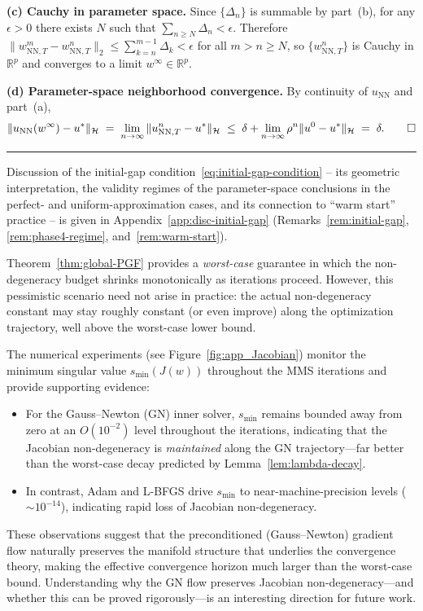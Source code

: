 \documentclass[twoside,11pt]{article}
\newcommand{\BlackBoxProof}{\rule{1.5ex}{1.5ex}}
\renewenvironment{proof}{\par\noindent{\bf Proof\ }}{\hfill\BlackBoxProof\par\medskip}
\newcommand{\R}{\mathbb{R}}
\newcommand{\NN}{\mathrm{NN}}
\newcommand{\calH}{\mathcal{H}}
\begin{document}
\begin{proof}
\smallskip
\noindent\textbf{(c) Cauchy in parameter space.}
Since $\{\Delta_n\}$ is summable by part~(b), for any $\epsilon>0$ there exists $N$ such that $\sum_{n\ge N}\Delta_n<\epsilon$. Therefore $\|w^m_{\NN,T}-w^n_{\NN,T}\|_2\le\sum_{k=n}^{m-1}\Delta_k<\epsilon$ for all $m>n\ge N$, so $\{w^n_{\NN,T}\}$ is Cauchy in $\R^p$ and converges to a limit $w^\infty\in\R^p$.

\smallskip
\noindent\textbf{(d) Parameter-space neighborhood convergence.}
By continuity of $u_\NN$ and part~(a),
\[
\|u_\NN(w^\infty)-u^*\|_\calH \;=\; \lim_{n\to\infty}\|u^n_{\NN,T}-u^*\|_\calH \;\le\;\delta+\lim_{n\to\infty}\rho^n\|u^0-u^*\|_\calH \;=\;\delta. \qedhere
\]
\end{proof}

Discussion of the initial-gap condition~\eqref{eq:initial-gap-condition} -- its geometric interpretation, the validity regimes of the parameter-space conclusions in the perfect- and uniform-approximation cases, and its connection to ``warm start'' practice -- is given in Appendix~\ref{app:disc-initial-gap} (Remarks~\ref{rem:initial-gap}, \ref{rem:phase4-regime}, and~\ref{rem:warm-start}).

\begin{remark}\label{rem:practical-jacobian}
Theorem~\ref{thm:global-PGF} provides a \emph{worst-case} guarantee in which the
non-degeneracy budget shrinks monotonically as iterations proceed.
However, this pessimistic scenario need not arise in practice:
the actual non-degeneracy constant may stay roughly constant (or even improve)
along the optimization trajectory, well above the worst-case lower bound.

The numerical experiments (see Figure~\ref{fig:app_Jacobian}) monitor the minimum singular value $s_{\min}(J(w))$
throughout the MMS iterations and provide supporting evidence:
\begin{itemize}
\item For the Gauss--Newton (GN) inner solver, $s_{\min}$ remains bounded away from zero
at an $O(10^{-2})$ level throughout the iterations, indicating that the Jacobian
non-degeneracy is \emph{maintained} along the GN trajectory---far better than the
worst-case decay predicted by Lemma~\ref{lem:lambda-decay}.
\item In contrast, Adam and L-BFGS drive $s_{\min}$ to near-machine-precision levels
($\sim 10^{-14}$), indicating rapid loss of Jacobian non-degeneracy.
\end{itemize}
These observations suggest that the preconditioned (Gauss--Newton) gradient flow
naturally preserves the manifold structure that underlies the convergence theory,
making the effective convergence horizon much larger than the worst-case bound.
Understanding why the GN flow preserves Jacobian non-degeneracy---and whether this
can be proved rigorously---is an interesting direction for future work.
\end{remark}
\end{document}
